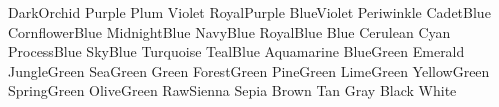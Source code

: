 \newColor DarkOrchid	  %
\newColor Purple	  %
\newColor Plum		  %
\newColor Violet	  %
\newColor RoyalPurple	  %
\newColor BlueViolet	  %
\newColor Periwinkle	  %
\newColor CadetBlue	  %
\newColor CornflowerBlue  %
\newColor MidnightBlue	  %
\newColor NavyBlue	  %
\newColor RoyalBlue	  %
\newColor Blue		  %
\newColor Cerulean	  %
\newColor Cyan		  %
\newColor ProcessBlue	  %
\newColor SkyBlue	  %
\newColor Turquoise	  %
\newColor TealBlue	  %
\newColor Aquamarine	  %
\newColor BlueGreen	  %
\newColor Emerald	  %
\newColor JungleGreen	  %
\newColor SeaGreen	  %
\newColor Green		  %
\newColor ForestGreen	  %
\newColor PineGreen	  %
\newColor LimeGreen	  %
\newColor YellowGreen	  %
\newColor SpringGreen	  %
\newColor OliveGreen	  %
\newColor RawSienna	  %
\newColor Sepia		  %
\newColor Brown		  %
\newColor Tan		  %
\newColor Gray		  %
\newColor Black		  %
\newColor White		  %



































































